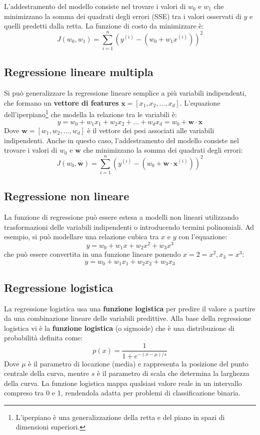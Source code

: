L'addestramento del modello consiste nel trovare i valori di $w_0$ e $w_1$ che minimizzano la somma dei quadrati degli errori (SSE) tra i valori osservati di $y$ e quelli predetti dalla retta. La funzione di costo da minimizzare è:
\[
J(w_0, w_1) = \sum_{i=1}^{n} (y^{(i)} - (w_0 + w_1 x^{(i)}))^2
\]

\subsection{Regressione lineare multipla}
Si può generalizzare la regressione lineare semplice a più variabili indipendenti, che formano un \textbf{vettore di features} $\mathbf{x} = [x_1, x_2, \dots, x_d]$. L'equazione dell'iperpiano\footnote{L'iperpiano è una generalizzazione della retta e del piano in spazi di dimensioni superiori.} che modella la relazione tra le variabili è:
\[
y = w_0 + w_1 x_1 + w_2 x_2 + \dots + w_d x_d = w_0 + \mathbf{w} \cdot \mathbf{x}
\]
Dove $\mathbf{w} = [w_1, w_2, \dots, w_d]$ è il vettore dei pesi associati alle variabili indipendenti. Anche in questo caso, l'addestramento del modello consiste nel trovare i valori di $w_0$ e $\mathbf{w}$ che minimizzano la somma dei quadrati degli errori:
\[
J(w_0, \mathbf{w}) = \sum_{i=1}^{n} (y^{(i)} - (w_0 + \mathbf{w} \cdot \mathbf{x}^{(i)}))^2
\]

\subsection{Regressione non lineare}
La funzione di regressione può essere estesa a modelli non lineari utilizzando trasformazioni delle variabili indipendenti o introducendo termini polinomiali. Ad esempio, si può modellare una relazione cubica tra $x$ e $y$ con l'equazione:
\[
y = w_0 + w_1x + w_2 x^2 + w_3 x^3
\]
che può essere convertita in una funzione lineare ponendo $x=2 = x^2, x_3 = x^3$:
\[
y = w_0 + w_1 x_1 + w_2 x_2 + w_3 x_3
\]

\subsection{Regressione logistica}
La regressione logistica usa una \textbf{funzione logistica} per predire il valore a partire da una combinazione lineare delle variabili predittive. Alla base della regressione logistica vi è la \textbf{funzione logistica} (o sigmoide) che è una distribuzione di probabilità definita come:
\[
p(x) = \frac{1}{1 + e^{-(x - \mu)/s}}
\]
Dove $\mu$ è il parametro di locazione (media) e rappresenta la posizione del punto centrale della curva, mentre $s$ è il parametro di scala che determina la larghezza della curva. La funzione logistica mappa qualsiasi valore reale in un intervallo compreso tra 0 e 1, rendendola adatta per problemi di classificazione binaria.

